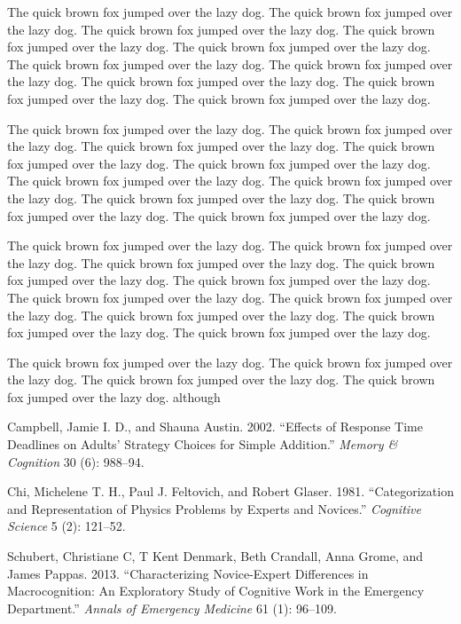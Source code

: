 \documentclass[journal=,manuscript=]{achemso}
\newlength{\cslhangindent}
\newenvironment{cslreferences}%
  {\setlength{\parindent}{0pt}%
  \everypar{\setlength{\hangindent}{\cslhangindent}}\ignorespaces}%
  {\par}
\theoremstyle{definition}
\theoremstyle{definition}
\theoremstyle{definition}
\theoremstyle{remark}
\begin{document}
The quick brown fox jumped over the lazy dog.
The quick brown fox jumped over the lazy dog.
The quick brown fox jumped over the lazy dog.
The quick brown fox jumped over the lazy dog.
The quick brown fox jumped over the lazy dog.
The quick brown fox jumped over the lazy dog.
The quick brown fox jumped over the lazy dog.
The quick brown fox jumped over the lazy dog.
The quick brown fox jumped over the lazy dog.
The quick brown fox jumped over the lazy dog.

The quick brown fox jumped over the lazy dog.
The quick brown fox jumped over the lazy dog.
The quick brown fox jumped over the lazy dog.
The quick brown fox jumped over the lazy dog.
The quick brown fox jumped over the lazy dog.
The quick brown fox jumped over the lazy dog.
The quick brown fox jumped over the lazy dog.
The quick brown fox jumped over the lazy dog.
The quick brown fox jumped over the lazy dog.
The quick brown fox jumped over the lazy dog.

The quick brown fox jumped over the lazy dog.
The quick brown fox jumped over the lazy dog.
The quick brown fox jumped over the lazy dog.
The quick brown fox jumped over the lazy dog.
The quick brown fox jumped over the lazy dog.
The quick brown fox jumped over the lazy dog.
The quick brown fox jumped over the lazy dog.
The quick brown fox jumped over the lazy dog.
The quick brown fox jumped over the lazy dog.
The quick brown fox jumped over the lazy dog.

The quick brown fox jumped over the lazy dog.
The quick brown fox jumped over the lazy dog.
The quick brown fox jumped over the lazy dog.
The quick brown fox jumped over the lazy dog.
although

\hypertarget{refs}{}
\begin{cslreferences}
\leavevmode\hypertarget{ref-Campbell02}{}%
Campbell, Jamie I. D., and Shauna Austin. 2002. ``Effects of Response Time Deadlines on Adults' Strategy Choices for Simple Addition.'' \emph{Memory \& Cognition} 30 (6): 988--94.

\leavevmode\hypertarget{ref-Chi81}{}%
Chi, Michelene T. H., Paul J. Feltovich, and Robert Glaser. 1981. ``Categorization and Representation of Physics Problems by Experts and Novices.'' \emph{Cognitive Science} 5 (2): 121--52.

\leavevmode\hypertarget{ref-Schubert13}{}%
Schubert, Christiane C, T Kent Denmark, Beth Crandall, Anna Grome, and James Pappas. 2013. ``Characterizing Novice-Expert Differences in Macrocognition: An Exploratory Study of Cognitive Work in the Emergency Department.'' \emph{Annals of Emergency Medicine} 61 (1): 96--109.
\end{cslreferences}
\end{document}
